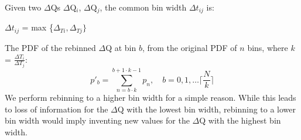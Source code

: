             Given two $\Delta$Qs $\Delta$Q$_i$, $\Delta$Q$_j$, the common bin width $\Delta t_{ij}$ is:
            \begin{center}
                $\Delta t_{ij}$ = max \{$\Delta_{Ti}, \Delta_{Tj} \}$
            \end{center}
            The PDF of the rebinned $\Delta$Q at bin $b$, from the original PDF of $n$ bins, where $k$ = $\frac{\Delta T_i}{\Delta T_j}$:
            \begin{equation}
                p'_b = \sum_{n=b \cdot k}^{b+ 1 \cdot k - 1} p_n, \quad b=0,1,\dots \lceil \frac{N}{k} \rceil  
            \end{equation}
            We perform rebinning to a higher bin width for a simple reason. While this leads to loss of information for the $\Delta$Q with the lowest bin width, rebinning to a lower bin width would imply inventing new values for the $\Delta$Q with the highest bin width.
